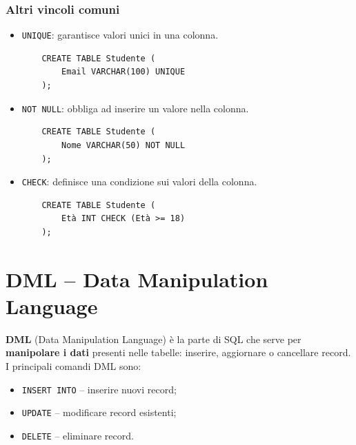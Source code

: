 \documentclass[a4paper,12pt]{article}
\newcommand{\code}[1]{\texttt{#1}}
\begin{document}
\subsubsection{Altri vincoli comuni}

\begin{itemize}
    \item \code{UNIQUE}: garantisce valori unici in una colonna.
    \begin{verbatim}
    CREATE TABLE Studente (
        Email VARCHAR(100) UNIQUE
    );
    \end{verbatim}

    \item \code{NOT NULL}: obbliga ad inserire un valore nella colonna.
    \begin{verbatim}
    CREATE TABLE Studente (
        Nome VARCHAR(50) NOT NULL
    );
    \end{verbatim}

    \item \code{CHECK}: definisce una condizione sui valori della colonna.
    \begin{verbatim}
    CREATE TABLE Studente (
        Età INT CHECK (Età >= 18)
    );
    \end{verbatim}
\end{itemize}




\newpage
\section{DML -- Data Manipulation Language}

\textbf{DML} (Data Manipulation Language) è la parte di SQL che serve per \textbf{manipolare i dati} presenti nelle tabelle: inserire, aggiornare o cancellare record.  
I principali comandi DML sono:

\begin{itemize}
    \item \code{INSERT INTO} -- inserire nuovi record;
    \item \code{UPDATE} -- modificare record esistenti;
    \item \code{DELETE} -- eliminare record.
\end{itemize}
\end{document}
